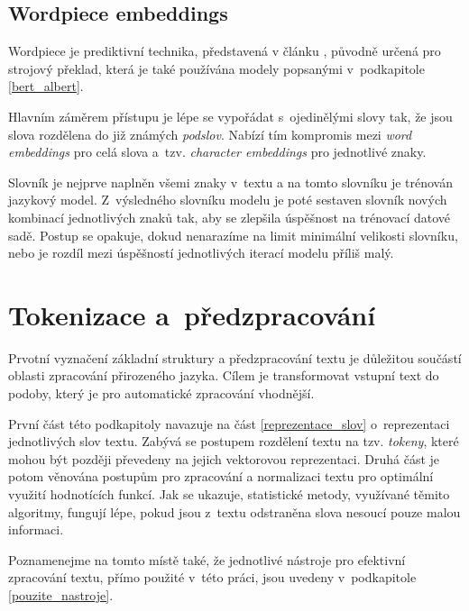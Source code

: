 \subsection{Wordpiece embeddings}
\label{wordpiece_embb}
Wordpiece je prediktivní technika, představená v článku \cite{wordpiece}, původně určená pro strojový překlad, která je také používána modely popsanými v~podkapitole \ref{bert_albert}.\par
Hlavním záměrem přístupu je lépe se vypořádat s~ojedinělými slovy tak, že jsou slova rozdělena do již známých \emph{podslov}. Nabízí tím kompromis mezi \emph{word embeddings} pro celá slova a~tzv. \emph{character embeddings} pro jednotlivé znaky.\par
Slovník je nejprve naplněn všemi znaky v~textu a na tomto slovníku je trénován jazykový model. Z~výsledného slovníku modelu je poté sestaven slovník nových kombinací jednotlivých znaků tak, aby se zlepšila úspěšnost na trénovací datové sadě. Postup se opakuje, dokud nenarazíme na limit minimální velikosti slovníku, nebo je rozdíl mezi úspěšností jednotlivých iterací modelu příliš malý.

\section{Tokenizace a~předzpracování}
\label{preprocessing}
Prvotní vyznačení základní struktury a předzpracování textu je důležitou součástí oblasti zpracování přirozeného jazyka. Cílem je transformovat vstupní text do podoby, který je pro automatické zpracování vhodnější. \par
První část této podkapitoly navazuje na část \ref{reprezentace_slov} o~reprezentaci jednotlivých slov textu. Zabývá se postupem rozdělení textu na tzv. \emph{tokeny}, které mohou být později převedeny na jejich vektorovou reprezentaci. Druhá část je potom věnována postupům pro zpracování a normalizaci textu pro optimální využití hodnotících funkcí. Jak se ukazuje, statistické metody, využívané těmito algoritmy, fungují lépe, pokud jsou z~textu odstraněna slova nesoucí pouze malou informaci. \par
Poznamenejme na tomto místě také, že jednotlivé nástroje pro efektivní zpracování textu, přímo použité v~této práci, jsou uvedeny v~podkapitole \ref{pouzite_nastroje}.


